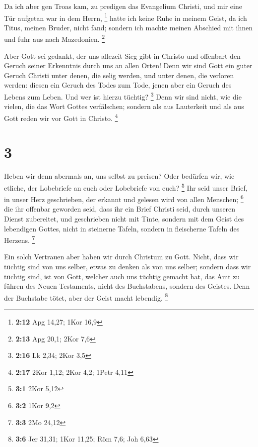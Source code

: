  Da ich aber gen Troas kam, zu predigen das Evangelium
Christi, und mir eine Tür aufgetan war in dem Herrn, \footnote{\textbf{2:12}
  Apg 14,27; 1Kor 16,9}  hatte ich keine Ruhe in meinem
Geist, da ich Titus, meinen Bruder, nicht fand; sondern ich machte
meinen Abschied mit ihnen und fuhr aus nach Mazedonien. \footnote{\textbf{2:13}
  Apg 20,1; 2Kor 7,6}

 Aber Gott sei gedankt, der uns allezeit Sieg gibt in
Christo und offenbart den Geruch seiner Erkenntnis durch uns an allen
Orten!  Denn wir sind Gott ein guter Geruch Christi unter
denen, die selig werden, und unter denen, die verloren werden:
 diesen ein Geruch des Todes zum Tode, jenen aber ein
Geruch des Lebens zum Leben. Und wer ist hierzu tüchtig? \footnote{\textbf{2:16}
  Lk 2,34; 2Kor 3,5}  Denn wir sind nicht, wie die vielen,
die das Wort Gottes verfälschen; sondern als aus Lauterkeit und als aus
Gott reden wir vor Gott in Christo. \footnote{\textbf{2:17} 2Kor 1,12;
  2Kor 4,2; 1Petr 4,11}

\hypertarget{section-1}{%
\section{3}\label{section-1}}

 Heben wir denn abermals an, uns selbst zu preisen? Oder
bedürfen wir, wie etliche, der Lobebriefe an euch oder Lobebriefe von
euch? \footnote{\textbf{3:1} 2Kor 5,12}  Ihr seid unser
Brief, in unser Herz geschrieben, der erkannt und gelesen wird von allen
Menschen; \footnote{\textbf{3:2} 1Kor 9,2}  die ihr offenbar
geworden seid, dass ihr ein Brief Christi seid, durch unseren Dienst
zubereitet, und geschrieben nicht mit Tinte, sondern mit dem Geist des
lebendigen Gottes, nicht in steinerne Tafeln, sondern in fleischerne
Tafeln des Herzens. \footnote{\textbf{3:3} 2Mo 24,12}

 Ein solch Vertrauen aber haben wir durch Christum zu Gott.
 Nicht, dass wir tüchtig sind von uns selber, etwas zu
denken als von uns selber; sondern dass wir tüchtig sind, ist von Gott,
 welcher auch uns tüchtig gemacht hat, das Amt zu führen des
Neuen Testaments, nicht des Buchstabens, sondern des Geistes. Denn der
Buchstabe tötet, aber der Geist macht lebendig. \footnote{\textbf{3:6}
  Jer 31,31; 1Kor 11,25; Röm 7,6; Joh 6,63}


